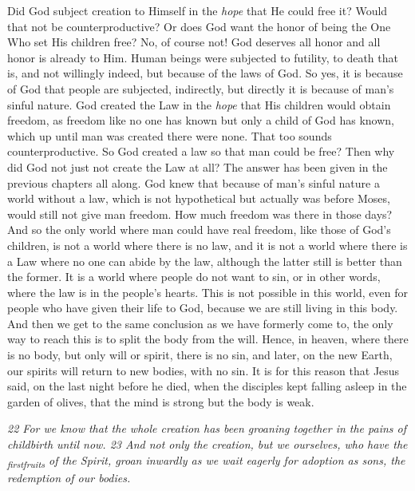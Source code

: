 Did God subject creation to Himself in the \emph{hope} that He could
free it? Would that not be counterproductive? Or does God want the honor
of being the One Who set His children free? No, of course not! God
deserves all honor and all honor is already to Him. Human beings were
subjected to futility, to death that is, and not willingly indeed, but
because of the laws of God. So yes, it is because of God that people are
subjected, indirectly, but directly it is because of man's sinful
nature. God created the Law in the \emph{hope} that His children would
obtain freedom, as freedom like no one has known but only a child of God
has known, which up until man was created there were none. That too
sounds counterproductive. So God created a law so that man could be
free? Then why did God not just not create the Law at all? The answer
has been given in the previous chapters all along. God knew that because
of man's sinful nature a world without a law, which is not hypothetical
but actually was before Moses, would still not give man freedom. How
much freedom was there in those days? And so the only world where man
could have real freedom, like those of God's children, is not a world
where there is no law, and it is not a world where there is a Law where
no one can abide by the law, although the latter still is better than
the former. It is a world where people do not want to sin, or in other
words, where the law is in the people's hearts. This is not possible in
this world, even for people who have given their life to God, because we
are still living in this body. And then we get to the same conclusion as
we have formerly come to, the only way to reach this is to split the
body from the will. Hence, in heaven, where there is no body, but only
will or spirit, there is no sin, and later, on the new Earth, our
spirits will return to new bodies, with no sin. It is for this reason
that Jesus said, on the last night before he died, when the disciples
kept falling asleep in the garden of olives, that the mind is strong but
the body is weak.

\emph{22 For we know that the whole creation has been groaning together
in the pains of childbirth until now. 23 And not only the creation, but
we ourselves, who have the \textsubscript{firstfruits} of the Spirit,
groan inwardly as we wait eagerly for adoption as sons, the redemption
of our bodies.}

